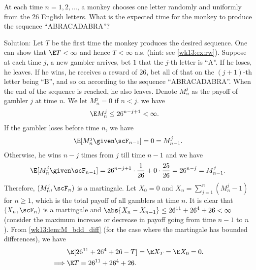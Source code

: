 \documentclass[../aipt.tex]{subfiles}
\begin{document}
\begin{Example}
At each time $n = 1, 2, \ldots$, a monkey chooses one letter randomly and uniformly from the 26 English letters. What is the expected time for the monkey to produce the sequence ``ABRACADABRA''?

Solution: Let $T$ be the first time the monkey produces the desired sequence. One can show that $\E T < \infty$ and hence $T < \infty$ a.s. (hint: see \cref{wk13:ex:rw}). Suppose at each time $j$, a new gambler arrives, bet $1$ that the $j$-th letter is ``A''. If he loses, he leaves. If he wins, he receives a reward of 26, bet all of that on the $(j+1)$-th letter being ``B'', and so on according to the sequence ``ABRACADABRA''. When the end of the sequence is reached, he also leaves. Denote $M_n^j$ as the payoff of gambler $j$ at time $n$. We let $M_n^j =0 $ if $n < j$. we have
\begin{align*}
\E M_n^j \leq 26^{n-j+1} &< \infty.  
\end{align*}
If the gambler loses before time $n$, we have
\begin{align*}
\E[M_n^j \given \scF_{n-1}] = 0 = M_{n-1}^j.
\end{align*}
Otherwise, he wins $n - j$ times from $j$ till time $n-1$ and we have
\begin{align*}
\E[M_n^j \given \scF_{n-1}] = 26^{n-j+1}\cdot\frac{1}{26} + 0\cdot \frac{25}{26} = 26^{n-j} = M_{n-1}^j.
\end{align*}
Therefore, $(M_n^j, \scF_n)$ is a martingale. Let $X_0=0$ and $X_n = \sum_{j=1}^n (M_n^j-1)$ for $n\geq1$, which is the total payoff of all gamblers at time $n$. It is clear that $(X_n, \scF_n)$ is a martingale and $\abs{X_n - X_{n-1}} \leq  26^{11} + 26^{4} + 26 < \infty$ (consider the maximum increase or decrease in payoff going from time $n-1$ to $n$). From \cref{wk13:lem:M_bdd_diff} (for the case where the martingale has bounded differences), we have 
\begin{align*}
&\E[26^{11} + 26^{4} + 26 - T] = \E X_T = \E X_0 = 0. \\
\implies
&\E T = 26^{11} + 26^{4} + 26.
\end{align*}
\end{Example}

%

\end{document}
